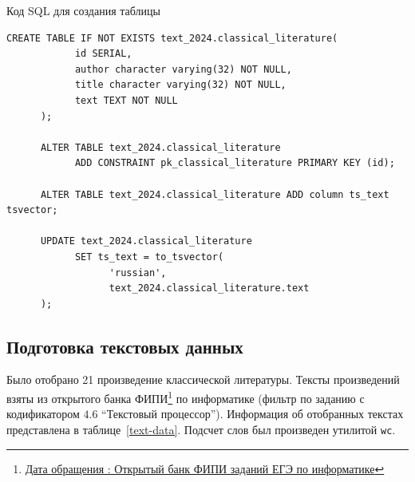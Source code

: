 \begin{algorithm}[H]
    \caption{Код SQL для создания таблицы}
    \label{init-db}
    \begin{lstlisting}[style=codelistingstyle]
      CREATE TABLE IF NOT EXISTS text_2024.classical_literature(
            id SERIAL,
            author character varying(32) NOT NULL,
            title character varying(32) NOT NULL,
            text TEXT NOT NULL
      );

      ALTER TABLE text_2024.classical_literature
            ADD CONSTRAINT pk_classical_literature PRIMARY KEY (id);

      ALTER TABLE text_2024.classical_literature ADD column ts_text tsvector;

      UPDATE text_2024.classical_literature
            SET ts_text = to_tsvector(
                  'russian',
                  text_2024.classical_literature.text
      );
      \end{lstlisting}
\end{algorithm}

\subsection{Подготовка текстовых данных}

Было отобрано 21 произведение классической литературы.
Тексты произведений взяты из открытого банка ФИПИ\footnote{\href{https://ege.fipi.ru/bank/index.php?proj=B9ACA5BBB2E19E434CD6BEC25284C67F}{Дата обращения : Открытый банк ФИПИ заданий ЕГЭ по информатике}} по информатике (фильтр по заданию с кодификатором $4.6$ \enquote{Текстовый процессор}).
Информация об отобранных текстах представлена в таблице~\ref{text-data}.
Подсчет слов был произведен утилитой \texttt{wc}.

